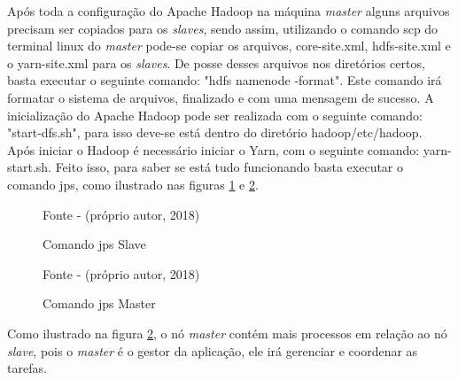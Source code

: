 Após toda a configuração do Apache Hadoop na máquina \textit{master} alguns arquivos precisam ser copiados para os \textit{slaves}, sendo assim, utilizando o comando scp do terminal linux do \textit{master} pode-se copiar os arquivos, core-site.xml, hdfs-site.xml e o yarn-site.xml para os \textit{slaves}. De posse desses arquivos nos diretórios certos, basta executar o seguinte comando: "hdfs namenode -format". Este comando irá formatar o sistema de arquivos, finalizado e com uma mensagem de sucesso. A inicialização do Apache Hadoop pode ser realizada com o seguinte comando: "start-dfs.sh", para isso deve-se está dentro do diretório hadoop/etc/hadoop. Após iniciar o Hadoop é necessário iniciar o Yarn, com o seguinte comando: yarn-start.sh. Feito isso, para saber se está tudo funcionando basta executar o comando jps, como ilustrado nas figuras \ref{Fig:Comando jps Slave} e \ref{Fig:Comando jps Master}.

\begin{figure}[htbp!] \begin{center}
	\caption{Comando jps Slave}
	\small{Fonte - (próprio autor, 2018)}
	\label{Fig:Comando jps Slave}
	\end{center} \end{figure}
    
    \begin{figure}[htbp!] \begin{center}
	\caption{Comando jps Master}
	\small{Fonte - (próprio autor, 2018)}
	\label{Fig:Comando jps Master}
	\end{center} \end{figure}

Como ilustrado na figura \ref{Fig:Comando jps Master}, o nó \textit{master} contém mais processos em relação ao nó \textit{slave}, pois o \textit{master} é o gestor da aplicação, ele irá gerenciar e coordenar as tarefas.

